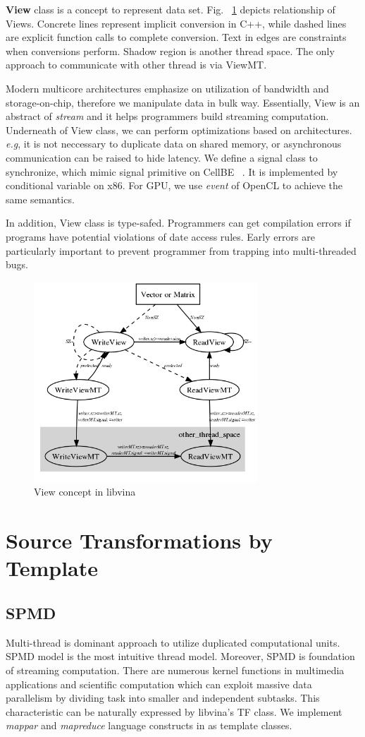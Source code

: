 \documentclass[10pt, conference, compsocconf]{IEEEtran}
\begin{document}
\textbf{View} class is a concept to represent data set.  Fig. ~\ref{fig:view} depicts relationship of Views. Concrete lines
represent implicit conversion in C++, while  dashed lines are explicit
function calls to complete conversion. Text in edges are constraints
when conversions perform. Shadow region is another thread space. The
only approach to communicate with other thread is via ViewMT.  

Modern multicore architectures emphasize on utilization of 
bandwidth and storage-on-chip, therefore we manipulate data in
bulk way. Essentially, View is an abstract of \emph{stream} and it
helps programmers build streaming computation. Underneath of View
class, we can perform optimizations based on architectures. \textit{e.g}, it is not neccessary to duplicate
data  on shared memory, or  asynchronous communication can be raised to
hide latency. We define a signal class to synchronize, which mimic
signal primitive on CellBE ~\cite{b19}. It is implemented by
conditional variable on x86. For GPU, we use \emph{event} of OpenCL to
achieve the same semantics.

In addition,  View class is type-safed. Programmers can get
compilation errors if programs have potential violations of date access rules. Early errors are particularly
important to prevent programmer from trapping into multi-threaded bugs.

\begin{figure}
\includegraphics[width=3.3in]{view_concept}
\caption{View concept in libvina}
\label{fig:view}
\end{figure}
\section{Source Transformations by Template}
\subsection{SPMD}
Multi-thread is dominant approach to utilize duplicated computational
units. SPMD model is the most intuitive thread model. Moreover,  SPMD is foundation of
streaming computation. There are numerous kernel functions in
multimedia applications and scientific computation which can 
exploit massive  data parallelism by dividing task into smaller and independent
subtasks. This characteristic can be naturally expressed by libvina's
TF class. We implement \emph{mappar} and \emph{mapreduce} language constructs in \cite{b1} as template classes.
\end{document}
